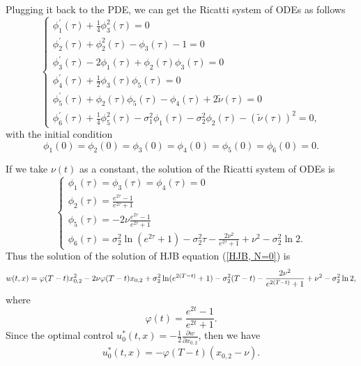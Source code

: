 \documentclass{article}
\begin{document}
Plugging it back to the PDE, we can get the Ricatti system of ODEs as follows
\begin{equation*}
    \begin{cases}
   \phi_{1}^{'} (\tau) + \frac{1}{4} \phi_{3}^{2}(\tau) = 0 \\
   \phi_{2}^{'} (\tau) + \phi_{2}^{2}(\tau) - \phi_{3}(\tau) - 1 = 0 \\
   \phi_{3}^{'} (\tau) - 2 \phi_{1}(\tau) + \phi_{2}(\tau)\phi_{3}(\tau) = 0 \\
   \phi_{4}^{'} (\tau) + \frac{1}{2} \phi_{3} (\tau) \phi_{5}(\tau) = 0 \\
   \phi_{5}^{'} (\tau) + \phi_{2} (\tau) \phi_{5}(\tau) - \phi_{4}(\tau) + 2 \widetilde{\nu} (\tau) = 0 \\
   \phi_{6}^{'} (\tau) + \frac{1}{4} \phi_{5}^{2} (\tau) - \sigma_{1}^{2} \phi_{1}(\tau) - \sigma_{2}^{2} \phi_{2}(\tau) - (\widetilde{\nu}(\tau))^{2} = 0,
   \end{cases}
\end{equation*}
with the initial condition
\begin{equation*}
    \phi_{1}(0) = \phi_{2}(0) = \phi_{3}(0) = \phi_{4}(0) = \phi_{5}(0) = \phi_{6}(0) = 0.
\end{equation*}

If we take $\nu(t)$ as a constant, the solution of the Ricatti system of ODEs is
\begin{equation}
    \begin{cases}
    \phi_{1} (\tau) = \phi_{3} (\tau) = \phi_{4} (\tau) = 0 \\
    \phi_{2} (\tau) = \frac{e^{2 \tau} - 1}{e^{2 \tau} + 1} \\
    \phi_{5} (\tau) = - 2 \nu \frac{e^{2 \tau} - 1}{e^{2 \tau} + 1} \\
    \phi_{6}(\tau) = \sigma_{2}^{2} \ln (e^{2 \tau} + 1) - \sigma_{2}^{2} \tau - \frac{2 \nu^2}{e^{2 \tau} + 1} + \nu^2 - \sigma_{2}^{2} \ln 2.
    \end{cases}
\end{equation}
Thus the solution of the solution of HJB equation (\ref{HJB, N=0}) is
\begin{equation}
    w (t, x) =  \varphi(T-t) x_{0, 2}^{2} - 2 \nu \varphi(T-t)  x_{0, 2} + \\ \sigma_{2}^{2} \ln (e^{2(T - t)} + 1) - \sigma_{2}^{2} (T-t) - \frac{2 \nu^2}{e^{2 (T-t)} + 1} + \nu^2 - \sigma_{2}^{2} \ln 2,
\end{equation}
where
\begin{equation*}
    \varphi(t) = \frac{e^{2t} - 1}{e^{2t} + 1}.
\end{equation*}
Since the optimal control $u_{0}^{*}(t, x) = - \frac{1}{2} \frac{\partial w}{\partial x_{0, 2}}$, then we have
\begin{equation}
    u_{0}^{*} (t,x) = - \varphi(T - t) (x_{0,2} - \nu).
\end{equation}
\end{document}
